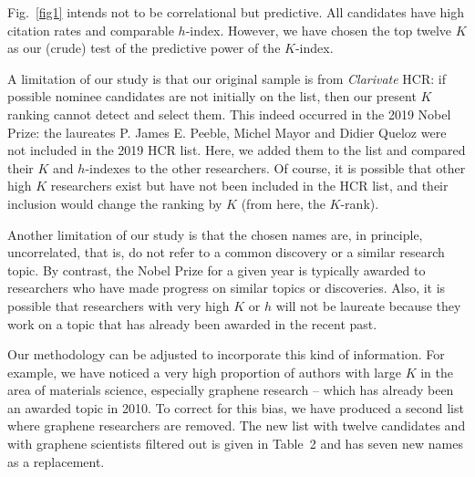 \documentclass[final,3p,times]{elsarticle}
\begin{document}
Fig.~\ref{fig1} intends not to be correlational but
predictive. All candidates have high citation rates and comparable
$h$-index. However, we have chosen the top twelve $K$ as our (crude)
test of the predictive power of the $K$-index.

A limitation of our study is that our original sample is from {\em
Clarivate} HCR: if possible nominee candidates are not
initially on the list, then our present $K$ ranking 
cannot detect and select them. This indeed occurred in the
2019 Nobel Prize: the laureates P. James E. Peeble, Michel Mayor
and Didier Queloz were not included in the 2019 HCR list.
Here, we added them to the list and compared their $K$ and $h$-indexes
to the other researchers. Of course, it is possible that other
high $K$ researchers exist but have not been included in the HCR
list, and their inclusion would change the ranking by $K$
(from here, the $K$-rank). 

Another limitation of our study is that the chosen names 
are, in principle,
uncorrelated, that is, do not refer to a common discovery or 
a similar research topic. By contrast, the Nobel Prize for a given year
is typically awarded to researchers who have made 
progress on similar topics or discoveries.  
Also, it is possible that researchers with very 
high $K$ or $h$ will not be
laureate because they work on a topic that has 
already been awarded in the recent past.  

Our methodology can be adjusted
to incorporate this kind of information. For example,
we have noticed a very high proportion of authors 
with large $K$ in the area
of materials science, especially graphene research -- which
has already been an awarded topic in 2010. 
To correct for this bias, 
we have produced a second list where graphene researchers are removed.
The new list with twelve candidates and with graphene scientists filtered out is given in Table~2 and has seven 
new names as a replacement.
\end{document}
